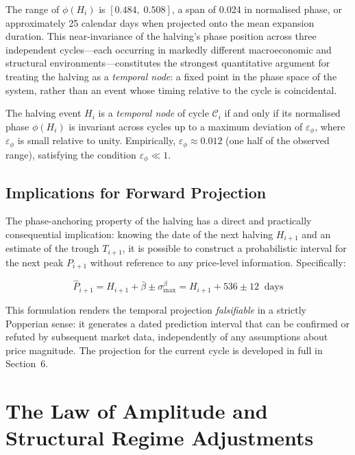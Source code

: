 The range of $\phi(H_i)$ is $[0.484,\; 0.508]$, a span of 0.024 in normalised
phase, or approximately 25 calendar days when projected onto the mean expansion
duration. This near-invariance of the halving's phase position across three
independent cycles---each occurring in markedly different macroeconomic and
structural environments---constitutes the strongest quantitative argument for
treating the halving as a \textit{temporal node}: a fixed point in the phase
space of the system, rather than an event whose timing relative to the cycle
is coincidental.

\begin{definition}
  The halving event $H_i$ is a \textit{temporal node} of cycle $\mathcal{C}_i$
  if and only if its normalised phase $\phi(H_i)$ is invariant across cycles
  up to a maximum deviation of $\varepsilon_\phi$, where $\varepsilon_\phi$ is
  small relative to unity. Empirically, $\varepsilon_\phi \approx 0.012$ (one
  half of the observed range), satisfying the condition $\varepsilon_\phi \ll 1$.
\end{definition}

\subsection{Implications for Forward Projection}

The phase-anchoring property of the halving has a direct and practically
consequential implication: knowing the date of the next halving $H_{i+1}$
and an estimate of the trough $T_{i+1}$, it is possible to construct a
probabilistic interval for the next peak $P_{i+1}$ without reference to any
price-level information. Specifically:

\begin{equation}
  \hat{P}_{i+1} = H_{i+1} + \bar{\beta} \pm \sigma_{\max}^{\beta}
                = H_{i+1} + 536 \pm 12 \ \text{ days}
  \label{eq:peak_projection}
\end{equation}

This formulation renders the temporal projection \textit{falsifiable} in a
strictly Popperian sense: it generates a dated prediction interval that can
be confirmed or refuted by subsequent market data, independently of any
assumptions about price magnitude. The projection for the current cycle is
developed in full in Section~6.


\section{The Law of Amplitude and Structural Regime Adjustments}


